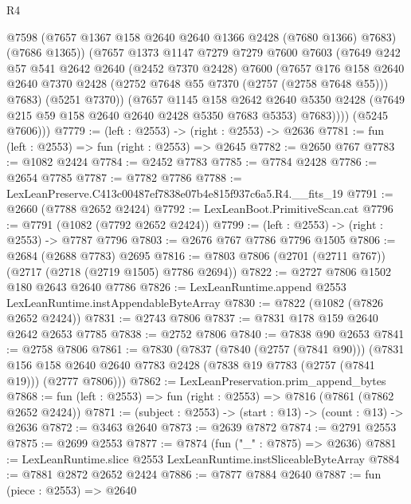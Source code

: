 \begin{lexlean}{R4}
\begin{coremodule}
              @7598
              (@7657 @1367 @158 @2640 @2640 @1366 @2428 (@7680 @1366) @7683)
              (@7686 @1365))
            (@7657
              @1373
              @1147
              @7279
              @7279
              @7600
              @7603
              (@7649
                @242
                @57
                @541
                @2642
                @2640
                (@2452 @7370 @2428)
                @7600
                (@7657
                  @176
                  @158
                  @2640
                  @2640
                  @7370
                  @2428
                  (@2752 @7648 @55 @7370 (@2757 (@2758 @7648 @55)))
                  @7683)
                (@5251 @7370))
              (@7657
                @1145
                @158
                @2642
                @2640
                @5350
                @2428
                (@7649 @215 @59 @158 @2640 @2640 @2428 @5350 @7683 @5353)
                @7683))))
        (@5245 @7606)))
@7779 := (left : @2553) -> (right : @2553) -> @2636
@7781 := fun (left : @2553) => fun (right : @2553) => @2645
@7782 := @2650 @767
@7783 := @1082 @2424
@7784 := @2452 @7783
@7785 := @7784 @2428
@7786 := @2654 @7785
@7787 := @7782 @7786
@7788 := LexLeanPreserve.C413c00487ef7838e07b4e815f937c6a5.R4.__fits_19
@7791 := @2660 (@7788 @2652 @2424)
@7792 := LexLeanBoot.PrimitiveScan.cat
@7796 := @7791 (@1082 (@7792 @2652 @2424))
@7799 := (left : @2553) -> (right : @2553) -> @7787 @7796
@7803 := @2676 @767 @7786 @7796 @1505
@7806 := @2684 (@2688 @7783) @2695
@7816 := @7803 @7806 (@2701 (@2711 @767)) (@2717 (@2718 (@2719 @1505) @7786 @2694))
@7822 := @2727 @7806 @1502 @180 @2643 @2640 @7786
@7826 := LexLeanRuntime.append @2553 LexLeanRuntime.instAppendableByteArray
@7830 := @7822 (@1082 (@7826 @2652 @2424))
@7831 := @2743 @7806
@7837 := @7831 @178 @159 @2640 @2642 @2653 @7785
@7838 := @2752 @7806
@7840 := @7838 @90 @2653
@7841 := @2758 @7806
@7861 := @7830
    (@7837
      (@7840 (@2757 (@7841 @90)))
      (@7831 @156 @158 @2640 @2640 @7783 @2428 (@7838 @19 @7783 (@2757 (@7841 @19))) (@2777 @7806)))
@7862 := LexLeanPreservation.prim_append_bytes
@7868 := fun (left : @2553) => fun (right : @2553) => @7816 (@7861 (@7862 @2652 @2424))
@7871 := (subject : @2553) -> (start : @13) -> (count : @13) -> @2636
@7872 := @3463 @2640
@7873 := @2639 @7872
@7874 := @2791 @2553
@7875 := @2699 @2553
@7877 := @7874 (fun ("_" : @7875) => @2636)
@7881 := LexLeanRuntime.slice @2553 LexLeanRuntime.instSliceableByteArray
@7884 := @7881 @2872 @2652 @2424
@7886 := @7877 @7884 @2640
@7887 := fun (piece : @2553) => @2640

\end{coremodule}
\end{lexlean}
